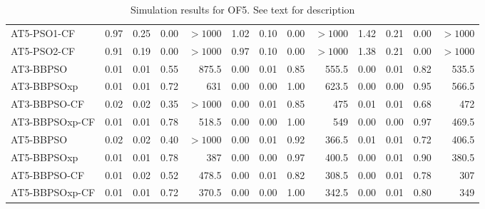 \documentclass[cmbright]{staauth}
\begin{document}
\begin{table}[ht]
\begin{tabular}{l|rrrr|rrrr|rrrr}
  AT5-PSO1-CF & 0.97 & 0.25 & 0.00 & $> 1000$ & 1.02 & 0.10 & 0.00 & $> 1000$ & 1.42 & 0.21 & 0.00 & $> 1000$ \\
  AT5-PSO2-CF & 0.91 & 0.19 & 0.00 & $> 1000$ & 0.97 & 0.10 & 0.00 & $> 1000$ & 1.38 & 0.21 & 0.00 & $> 1000$ \\
   \hline
AT3-BBPSO & 0.01 & 0.01 & 0.55 & 875.5 & 0.00 & 0.01 & 0.85 & 555.5 & 0.00 & 0.01 & 0.82 & 535.5 \\
  AT3-BBPSOxp & 0.01 & 0.01 & 0.72 & 631 & 0.00 & 0.00 & 1.00 & 623.5 & 0.00 & 0.00 & 0.95 & 566.5 \\
  AT3-BBPSO-CF & 0.02 & 0.02 & 0.35 & $> 1000$ & 0.00 & 0.01 & 0.85 & 475 & 0.01 & 0.01 & 0.68 & 472 \\
  AT3-BBPSOxp-CF & 0.01 & 0.01 & 0.78 & 518.5 & 0.00 & 0.00 & 1.00 & 549 & 0.00 & 0.00 & 0.97 & 469.5 \\
   \hline
AT5-BBPSO & 0.02 & 0.02 & 0.40 & $> 1000$ & 0.00 & 0.01 & 0.92 & 366.5 & 0.01 & 0.01 & 0.72 & 406.5 \\
  AT5-BBPSOxp & 0.01 & 0.01 & 0.78 & 387 & 0.00 & 0.00 & 0.97 & 400.5 & 0.00 & 0.01 & 0.90 & 380.5 \\
  AT5-BBPSO-CF & 0.01 & 0.02 & 0.52 & 478.5 & 0.00 & 0.01 & 0.82 & 308.5 & 0.00 & 0.01 & 0.78 & 307 \\
  AT5-BBPSOxp-CF & 0.01 & 0.01 & 0.72 & 370.5 & 0.00 & 0.00 & 1.00 & 342.5 & 0.00 & 0.01 & 0.80 & 349 \\
   \hline
\end{tabular}
\endgroup
\caption{Simulation results for OF5. See text for description}
\label{tab:psosim5}
\end{table}
\end{document}
